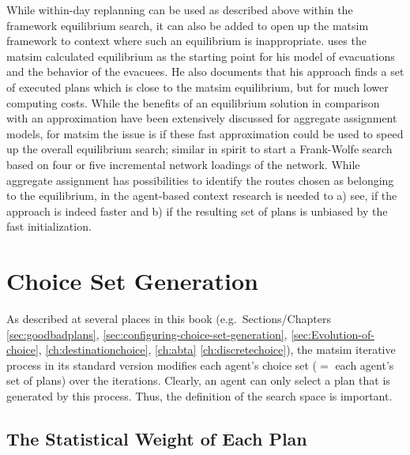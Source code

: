 While within-day replanning can be used as described above within the framework equilibrium search, it can also be added to open up the \gls{matsim} framework to context where such an equilibrium is inappropriate. 
%
\citet[][]{Dobler_PhDThesis_2013} uses the \gls{matsim} calculated equilibrium as the starting point for his model of evacuations and the behavior of the evacuees. 
He also documents that his approach finds a set of executed plans which is close to the \gls{matsim} equilibrium, but for much lower computing costs. 
While the benefits of an equilibrium solution in comparison with an approximation have been extensively discussed for aggregate assignment models, for \gls{matsim} the issue is if these fast approximation could be used to speed up the overall equilibrium search; similar in spirit to start a Frank-Wolfe search based on four or five incremental network loadings of the network.
While aggregate assignment has possibilities to identify the routes chosen as belonging to the equilibrium, in the agent-based context research is needed to a) see, if the approach is indeed faster and b) if the resulting set of plans is unbiased by the fast initialization. 

\section{Choice Set Generation}
\label{sec:choicesets}

As described at several places in this book (e.g.\ Sections/Chapters
\ref{sec:goodbadplans},
\ref{sec:configuring-choice-set-generation}, 
\ref{sec:Evolution-of-choice},
\ref{ch:destinationchoice},
\ref{ch:abta}
\ref{ch:discretechoice}), the \gls{matsim} iterative process in its standard version modifies each agent's choice set ($=$ each agent's set of plans) over the iterations.  
%
Clearly, an agent can only select a plan that is generated by this process.  Thus, the definition of the search space is important.

\subsection{The Statistical Weight of Each Plan}
\label{sec:stat-weight-of-plan}

